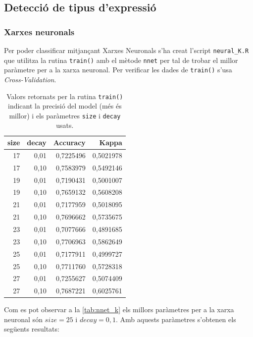 \documentclass[a4paper]{article}
\begin{document}
\subsection{Detecció de tipus d'expressió}
\subsubsection{Xarxes neuronals}

Per poder classificar mitjançant Xarxes Neuronals s'ha creat l'script \verb|neural_K.R| que utilitza la rutina \verb|train()| amb el mètode \verb|nnet| per tal de trobar el millor paràmetre per a la xarxa neuronal. Per verificar les dades de \verb|train()| s'usa \emph{Cross-Validation}.

\begin{table}[H]
	\centering
	\def\arraystretch{1.2}
	\begin{tabular}{|rrrr|}
		\hline
		size & decay & Accuracy & Kappa \\
		\hline
		17 & 0,01 & 0,7225496 & 0,5021978 \\
		17 & 0,10 & 0,7583979 & 0,5492146 \\
		19 & 0,01 & 0,7190431 & 0,5001007 \\
		19 & 0,10 & 0,7659132 & 0,5608208 \\
		21 & 0,01 & 0,7177959 & 0,5018095 \\
		21 & 0,10 & 0,7696662 & 0,5735675 \\
		23 & 0,01 & 0,7077666 & 0,4891685 \\
		23 & 0,10 & 0,7706963 & 0,5862649 \\
		25 & 0,01 & 0,7177911 & 0,4999727 \\
		\rowcolor{Orange!40}
		25 & 0,10 & 0,7711760 & 0,5728318 \\
		27 & 0,01 & 0,7255627 & 0,5074409 \\
		27 & 0,10 & 0,7687221 & 0,6025761 \\
		\hline
	\end{tabular}
	\captionsetup{width=0.6\textwidth}
	\caption{Valors retornats per la rutina \texttt{train()} indicant la precisió del model (més és millor) i els paràmetres \texttt{size} i \texttt{decay} usats.}
	\label{tab:nnet_k}
\end{table}

Com es pot observar a la \autoref{tab:nnet_k} els millors paràmetres per a la xarxa neuronal són $size = 25$ i $decay = 0,1$. Amb aquests paràmetres s'obtenen els següents resultats:
\end{document}
